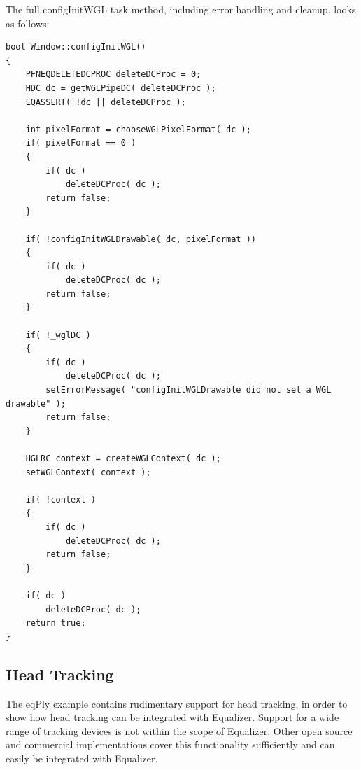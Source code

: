 \documentclass[10pt,a4]{scrartcl}
\begin{document}
The full \textsf{configInitWGL} task method, including error handling
and cleanup, looks as follows:

{\footnotesize\begin{lstlisting}
bool Window::configInitWGL()
{
    PFNEQDELETEDCPROC deleteDCProc = 0;
    HDC dc = getWGLPipeDC( deleteDCProc );
    EQASSERT( !dc || deleteDCProc );

    int pixelFormat = chooseWGLPixelFormat( dc );
    if( pixelFormat == 0 )
    {
        if( dc )
            deleteDCProc( dc );
        return false;
    }

    if( !configInitWGLDrawable( dc, pixelFormat ))
    {
        if( dc )
            deleteDCProc( dc );
        return false;
    }

    if( !_wglDC )
    {
        if( dc )
            deleteDCProc( dc );
        setErrorMessage( "configInitWGLDrawable did not set a WGL drawable" );
        return false;
    }

    HGLRC context = createWGLContext( dc );
    setWGLContext( context );

    if( !context )
    {
        if( dc )
            deleteDCProc( dc );
        return false;
    }

    if( dc )
        deleteDCProc( dc );
    return true;
}
\end{lstlisting}}


\subsection{\label{sTracking}Head Tracking}

The \textsf{eqPly} example contains rudimentary support for head
tracking, in order to show how head tracking can be integrated with
Equalizer. Support for a wide range of tracking devices is not within the
scope of Equalizer. Other open source and commercial implementations
cover this functionality sufficiently and can easily be integrated with
Equalizer.
\end{document}
